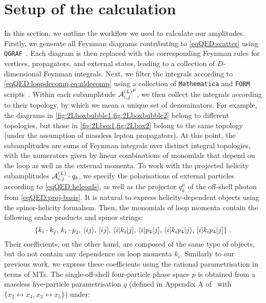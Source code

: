 \documentclass[main.tex]{subfiles}
\begin{document}
\section{Setup of the calculation}
\label{secQED:calc}

In this section, we outline the workflow we used to calculate our amplitudes.
Firstly, we generate all Feynman diagrams contributing to \cref{eqQED:scatter}
using \texttt{QGRAF}~\cite{Nogueira:1991ex}. Each diagram is then replaced with
the corresponding Feynman rules for vertices, propagators, and external states,
leading to a collection of $D$-dimensional Feynman integrals. Next, we filter
the integrals according to \cref{eqQED:loopdecomp,eq:nldecomp} using a collection
of \texttt{Mathematica} and \texttt{FORM} scripts~\cite{Kuipers:2012rf,
Ruijl:2017dtg}. Within each subamplitude ${\mathcal{A}^{(L)}_{i, j}}^{\mu}$, we then collect the
integrals according to their topology, by which we mean a unique set of
denominators. For example, the diagrams in
\cref{fig:2Lboxbubble1,fig:2Lboxbubble2} belong to different topologies, but
those in \cref{fig:2Lbox1,fig:2Lbox2} belong to the same topology (under the
assumption of massless lepton propagators). At this point, the subamplitudes
are sums of Feynman integrals over distinct integral topologies, with the
numerators given by linear combinations of monomials that depend on the loop as
well as the external momenta. To work with the projected helicity subamplitudes
$\mathcal{A}^{(L)}_{i,j}\cdot q_k$, we specify the polarisations of external particles
according to \cref{eqQED:helconfs}, as well as the projector $q_k^\mu$ of the
off-shell photon from \cref{eqQED:proj-basis}. It is natural to express
helicity-dependent objects using the spinor-helicity formalism. Then, the
monomials of loop momenta contain the following scalar products and spinor
strings:
\begin{equation} \label{eqQED:loopmomobjects}
	\left\{ k_i \cdot k_j, \,
    k_i \cdot p_j ,\,
    \langle ij \rangle,\,
    [ ij ],\,
    \langle i |k_i |j],\,
    \langle i |p_4 |j],\,
    \langle i|k_i p_4|j \rangle,\,
    [i| k_i p_4 |j] \right\} \,.
\end{equation}
Their coefficients, on the other hand, are composed of the same type of
objects, but do not contain any dependence on loop momenta $k_i$.  Similarly to our previous work, we express these coefficients using the rational parametrisation in terms of MTs. The single-off-shell four-particle phase space $p$ is obtained from a massless five-particle parametrisation $q$ (defined in Appendix A of~ with $\{x_2\leftrightarrow x_4,x_3\leftrightarrow x_5\}$) under:
\end{document}
